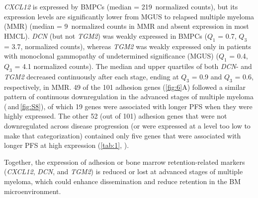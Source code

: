 \textit{CXCL12} is expressed by BMPCs (median = 219~normalized counts), but its
expression levels are significantly lower from MGUS to relapsed multiple myeloma
(MMR) (median = 9~normalized counts in MMR and absent expression in most HMCL).
\textit{DCN} (but not \textit{TGM2}) was weakly expressed in BMPCs ($Q_1$ = 0.7,
$Q_3$ = 3.7, normalized counts), whereas \textit{TGM2} was weakly expressed only
in patients with monoclonal gammopathy of undetermined significance (MGUS)
($Q_1$ = 0.4, $Q_3$ = 4.1 normalized counts). The median and upper quartiles of
both \textit{DCN}- and \textit{TGM2} decreased continuously after each stage,
ending at $Q_3$ = 0.9 and $Q_3$ = 0.6, respectively, in MMR. 49 of the 101 adhesion genes
(\autoref{fig:6}A) followed a similar pattern of continuous downregulation in
the advanced stages of multiple myeloma (\,and\,\ref{fig:S8}), of which 19 genes were associated with
longer PFS when they were highly expressed. The other 52 (out of 101) adhesion
genes that were not downregulated across disease progression (or were expressed
at a level too low to make that categorization) contained only five genes that
were associated with longer PFS at high expression (\autoref{tab:1},
).


Together, the expression of adhesion or bone marrow retention-related markers
(\textit{CXCL12}, \textit{DCN}, and \textit{TGM2}) is reduced or lost at
advanced stages of multiple myeloma, which could enhance dissemination and
reduce retention in the BM microenvironment.



